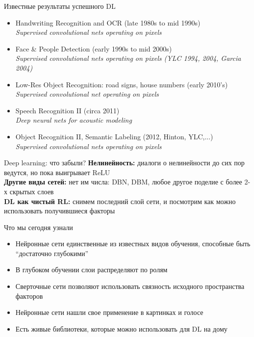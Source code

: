 \documentclass[14pt, fleqn, xcolor={dvipsnames, table}]{beamer}
\begin{document}
\begin{frame}{Известные результаты успешного DL}
\small
\begin{itemize}
  \item Handwriting Recognition and OCR (late 1980s to mid 1990s)\\
\textit{Supervised convolutional nets operating on pixels}
  \item Face \& People Detection (early 1990s to mid 2000s)\\
\textit{Supervised convolutional nets operating on pixels (YLC 1994, 2004, Garcia 2004)}
  \item Low-Res Object Recognition: road signs, house numbers (early 2010's)\\
\textit{Supervised convolutional net operating on pixels}
  \item Speech Recognition II (circa 2011) \\
\textit{Deep neural nets for acoustic modeling}
  \item Object Recognition II, Semantic Labeling (2012, Hinton, YLC,...) \\
\textit{Supervised convolutional nets operating on pixels}
\end{itemize}
\end{frame}

\begin{frame}{Deep learning: что забыли?}
\textbf{\color{blue}Нелинейность:} диалоги о нелинейности до сих пор ведутся, но пока выигрывает ReLU \\
\textbf{\color{blue}Другие виды сетей:} нет им числа: DBN, DBM, любое другое поделие с более 2-х скрытых слоев \\
\textbf{\color{blue}DL как чистый RL:} снимем последний слой сети, и посмотрим как можно использовать получившиеся факторы
\end{frame}

\begin{frame}{Что мы сегодня узнали}
\begin{itemize}
  \item Нейронные сети единственные из известных видов обучения, способные быть ``достаточно глубокими''
  \item В глубоком обучении слои распределяют по ролям
  \item Сверточные сети позволяют использовать связность исходного пространства факторов
  \item Нейронные сети нашли свое применение в картинках и голосе
  \item Есть живые библиотеки, которые можно использовать для DL на дому
\end{itemize}
\end{frame}
\end{document}
